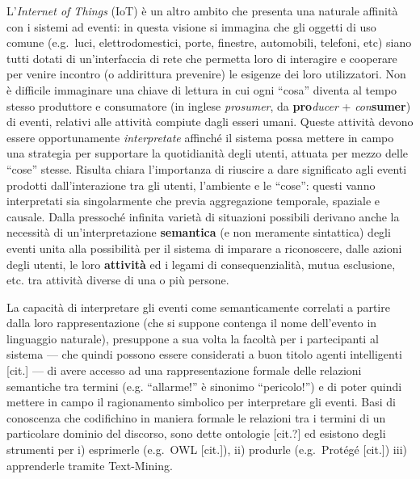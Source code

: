 L'\emph{Internet of Things} (IoT) è un altro ambito che presenta una
naturale affinità con i sistemi ad eventi: in questa visione si immagina
che gli oggetti di uso comune (e.g.~luci, elettrodomestici, porte,
finestre, automobili, telefoni, etc) siano tutti dotati di
un'interfaccia di rete che permetta loro di interagire e cooperare per
venire incontro (o addirittura prevenire) le esigenze dei loro
utilizzatori. Non è difficile immaginare una chiave di lettura in cui
ogni ``cosa'' diventa al tempo stesso produttore e consumatore (in
inglese \emph{prosumer}, da \textbf{pro}\emph{ducer} +
\emph{con}\textbf{sumer}) di eventi, relativi alle attività compiute
dagli esseri umani. Queste attività devono essere opportunamente
\emph{interpretate} affinché il sistema possa mettere in campo una
strategia per supportare la quotidianità degli utenti, attuata per mezzo
delle ``cose'' stesse. Risulta chiara l'importanza di riuscire a dare
significato agli eventi prodotti dall'interazione tra gli utenti,
l'ambiente e le ``cose'': questi vanno interpretati sia singolarmente
che previa aggregazione temporale, spaziale e causale. Dalla pressoché
infinita varietà di situazioni possibili derivano anche la necessità di
un'interpretazione \textbf{semantica} (e non meramente sintattica) degli
eventi unita alla possibilità per il sistema di imparare a riconoscere,
dalle azioni degli utenti, le loro \textbf{attività} ed i legami di
consequenzialità, mutua esclusione, etc. tra attività diverse di una o
più persone.

La capacità di interpretare gli eventi come semanticamente correlati a
partire dalla loro rappresentazione (che si suppone contenga il nome
dell'evento in linguaggio naturale), presuppone a sua volta la facoltà
per i partecipanti al sistema --- che quindi possono essere considerati
a buon titolo agenti intelligenti {[}cit.{]} --- di avere accesso ad una
rappresentazione formale delle relazioni semantiche tra termini (e.g.
``allarme!'' è sinonimo ``pericolo!'') e di poter quindi mettere in
campo il ragionamento simbolico per interpretare gli eventi. Basi di
conoscenza che codifichino in maniera formale le relazioni tra i termini
di un particolare dominio del discorso, sono dette ontologie {[}cit.?{]}
ed esistono degli strumenti per i) esprimerle (e.g.~OWL {[}cit.{]}), ii)
produrle (e.g.~Protégé {[}cit.{]}) iii) apprenderle tramite Text-Mining.
